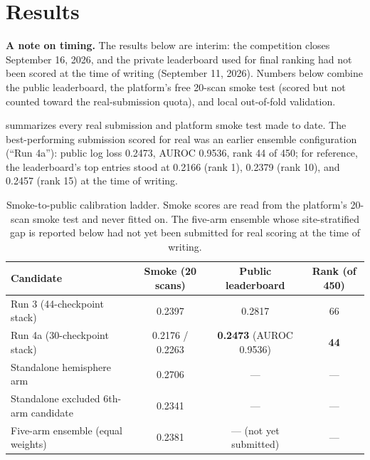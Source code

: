 \documentclass[11pt]{article}
\begin{document}
\section*{Results}
\label{sec:results}

\textbf{A note on timing.} The results below are interim: the competition closes September 16, 2026, and the private leaderboard used for final ranking had not been scored at the time of writing (September 11, 2026). Numbers below combine the public leaderboard, the platform's free 20-scan smoke test (scored but not counted toward the real-submission quota), and local out-of-fold validation.

 summarizes every real submission and platform smoke test made to date. The best-performing submission scored for real was an earlier ensemble configuration (``Run 4a''): public log loss 0.2473, AUROC 0.9536, rank 44 of 450; for reference, the leaderboard's top entries stood at 0.2166 (rank 1), 0.2379 (rank 10), and 0.2457 (rank 15) at the time of writing.

\begin{table}[h]
\centering
\small
\caption{Smoke-to-public calibration ladder. Smoke scores are read from the platform's 20-scan smoke test and never fitted on. The five-arm ensemble whose site-stratified gap is reported below had not yet been submitted for real scoring at the time of writing.}
\label{tab:ladder}
\begin{tabular}{@{}lccc@{}}
\toprule
\textbf{Candidate} & \textbf{Smoke (20 scans)} & \textbf{Public leaderboard} & \textbf{Rank (of 450)} \\
\midrule
Run 3 (44-checkpoint stack) & 0.2397 & 0.2817 & 66 \\
Run 4a (30-checkpoint stack) & 0.2176 / 0.2263 & \textbf{0.2473} (AUROC 0.9536) & \textbf{44} \\
Standalone hemisphere arm & 0.2706 & --- & --- \\
Standalone excluded 6th-arm candidate & 0.2341 & --- & --- \\
Five-arm ensemble (equal weights) & 0.2381 & --- (not yet submitted) & --- \\
\bottomrule
\end{tabular}
\end{table}
\end{document}
